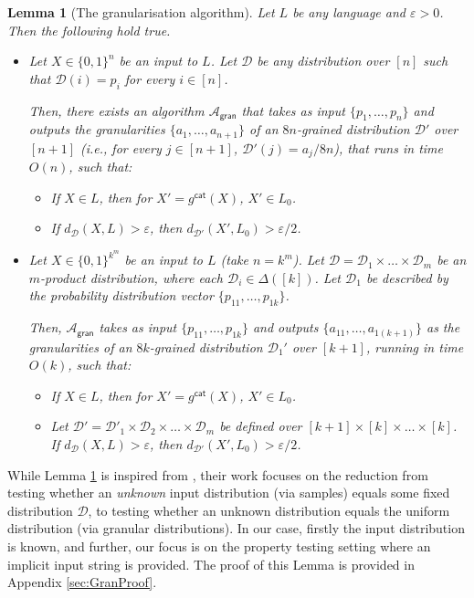 \documentclass[10pt,a4paper]{article}
\newtheorem{lemma}[theorem]{Lemma}
\newcommand{\gran}{\mathsf{gran}}
\newcommand{\sD}{\mathcal{D}}
\newcommand{\sA}{\mathcal{A}}
\begin{document}
\begin{lemma}[The granularisation algorithm]
\label{lem:make_granular}
Let $L$ be any language and $\varepsilon > 0$. Then the following hold true.
\begin{itemize}
    \item Let $X \in \{0,1\}^n$ be an input to $L$. Let $\sD$ be any distribution over $[n]$ such that $\sD(i) = p_i$ for every $i \in [n]$.
    
    Then, there exists an algorithm $\sA_{\gran}$ that takes as input $\{p_1, \dots, p_n\}$ and outputs the granularities $\{a_1, \dots, a_{n+1}\}$ of an $8n$-grained distribution $\sD'$ over $[n+1]$ (i.e., for every $j \in [n+1]$, $\sD'(j) = a_j/8n$), that runs in time $O(n)$, such that:
    \begin{itemize}
        \item If $X \in L$, then for $X' = g^{\mathsf{cat}}(X)$, $X' \in L_0$.
        \item If $d_\sD (X,L) > \varepsilon$, then $d_{\sD'} (X',L_0) > \varepsilon/2$.
    \end{itemize}
    
    \item Let $X \in \{0,1\}^{k^m}$ be an input to $L$ (take $n = k^m$). Let $\sD = \sD_1 \times \dots \times \sD_m$ be an $m$-product distribution, where each $\sD_i \in \Delta([k])$. Let $\sD_1$ be described by the probability distribution vector $\{p_{11}, \dots, p_{1k}\}$. 
    
    Then, $\sA_{\gran}$ takes as input $\{p_{11}, \dots, p_{1k}\}$ and outputs $\{a_{11}, \dots, a_{1(k+1)}\}$ as the granularities of an $8k$-grained distribution $\sD_1'$ over $[k+1]$, running in time $O(k)$, such that:
    \begin{itemize}
        \item If $X \in L$, then for $X' = g^{\mathsf{cat}}(X)$, $X' \in L_0$.
        \item Let $\sD' = \sD'_1 \times \sD_2 \times \dots \times \sD_m$ be defined over $[k+1] \times [k] \times \dots \times [k]$. If $d_\sD (X,L) > \varepsilon$, then $d_{\sD'} (X',L_0) > \varepsilon/2$.
    \end{itemize}
\end{itemize}
\end{lemma}
While Lemma \ref{lem:make_granular} is inspired from \cite{Gol20}, their work focuses on the reduction from testing whether an \textit{unknown} input distribution (via samples) equals some fixed distribution $\sD$, to testing whether an unknown distribution equals the uniform distribution (via granular distributions). In our case, firstly the input distribution is known, and further, our focus is on the property testing setting where an implicit input string is provided. The proof of this Lemma is provided in Appendix \ref{sec:GranProof}.
\end{document}
